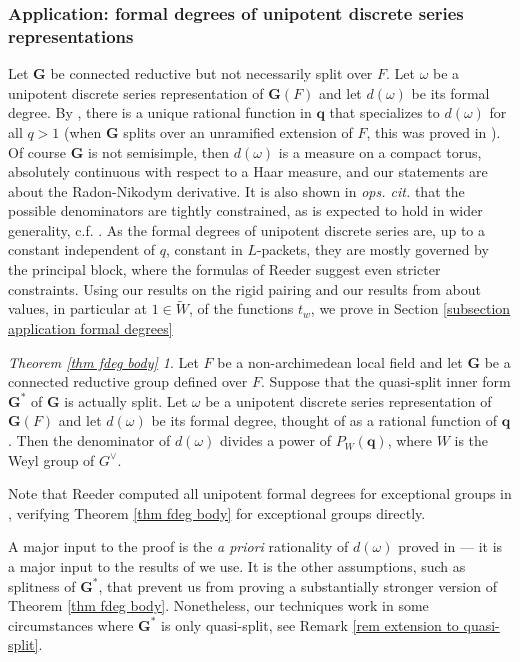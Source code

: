 \documentclass[10pt]{article}
\newcommand{\G}{\mathbf{G}}
\newcommand{\bq}{\mathbf{q}}
\theoremstyle{definition}
\theoremstyle{remark}
\newcommand{\Zur}{Z_{G^\vee}(u)^{\mathrm{red}}}
\begin{document}
\subsubsection{Application: formal degrees of unipotent discrete series representations}
Let $\G$ be connected reductive but not necessarily split over $F$. Let $\omega$ be a unipotent discrete series 
representation of $\G(F)$ and let $d(\omega)$ be its formal degree. 
By \cite{Solleveldfdegsequel}, there is a unique rational function in $\bq$ that
specializes to $d(\omega)$ for all $q>1$ (when $\G$ splits over an unramified extension of $F$, this was proved in \cite{FOS}). Of course $\G$ is not semisimple, then 
$d(\omega)$ is a measure on a compact torus, absolutely continuous with respect to a Haar measure, and our
statements are about the Radon-Nikodym derivative.
It is also shown in \textit{ops. cit.} that the possible denominators
are tightly constrained, as is expected to hold in wider generality, c.f. \cite[Prop. 4.1]{GrossReeder}.
As the formal degrees of unipotent discrete series are, up to a constant independent of $q$, constant in 
$L$-packets, they are mostly governed by the principal block, where the formulas of Reeder \cite{Reeder} suggest 
even stricter constraints. Using our results  on the rigid pairing and our results from \cite{Plancherel} about 
values, in particular at $1\in\tilde{W}$, of the functions $t_w$, we prove in Section \ref{subsection application formal degrees} 
%
\theoremstyle{Theorem}
\newtheorem*{thm:fdeg}{Theorem \ref{thm fdeg body}}
\begin{thm:fdeg}
Let $F$ be a non-archimedean local field and let $\G$ be a connected reductive group defined over $F$. 
Suppose that the quasi-split inner form $\G^*$ of $\G$ is actually split. Let $\omega$ be a unipotent discrete 
series representation of $\G(F)$ and let $d(\omega)$ be its formal degree, thought of as a rational function of 
$\bq$. Then the denominator of $d(\omega)$ divides a power of $P_W(\bq)$, where $W$ is the Weyl group of 
$G^\vee$.
\end{thm:fdeg}
%
Note that Reeder computed all unipotent formal degrees for exceptional groups in 
\cite{ReederLeubeck}, verifying Theorem \ref{thm fdeg body} for exceptional groups directly.

A major input to the proof is the \textit{a priori} rationality of $d(\omega)$ proved in \cite{FOS}--- it is a 
major input to the results of \cite{Plancherel} we use. It is the other assumptions, such as splitness of 
$\G^*$, that prevent us from proving a substantially stronger version of Theorem \ref{thm fdeg body}. 
Nonetheless, our techniques work in some circumstances where $\G^*$ is only quasi-split, see Remark 
\ref{rem extension to quasi-split}.
%
\end{document}
